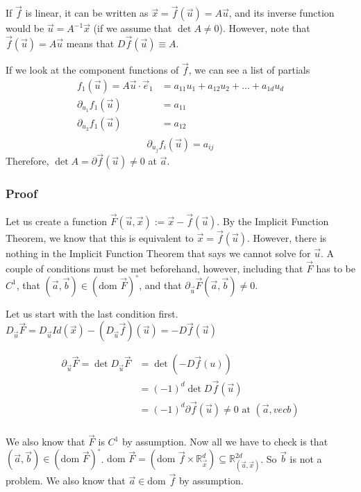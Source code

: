 \documentclass[11 pt, twoside]{article}
\begin{document}
If $\vec{f}$ is linear, it can be written as $\vec{x} = \vec{f}(\vec{u}) =
A\vec{u}$, and its inverse function would be $\vec{u} = A^{-1}\vec{x}$ (if we
assume that $\det A \neq 0$). However, note that $\vec{f}(\vec{u}) = A\vec{u}$
means that $D\vec{f}(\vec{u}) \equiv A$.

If we look at the component functions of $\vec{f}$, we can see a list of
partials
\begin{align*}
f_1(\vec{u}) = A\vec{u} \cdot \vec{e}_1 &= a_{11}u_1 + a_{12}u_2 + \dots + a_{1d}u_d\\
\partial_{u_1}f_1(\vec{u}) &= a_{11}\\
\partial_{u_2}f_1(\vec{u}) &= a_{12}\\
\end{align*}
\[
\boxed{\partial_{u_j} f_i (\vec{u}) = a_{ij}}
\]
Therefore, $\det A = \partial \vec{f}(\vec{u}) \neq 0$ at $\vec{a}$.

\subsubsection{Proof}

Let us create a function $\vec{F} (\vec{u}, \vec{x}) := \vec{x} -
\vec{f}(\vec{u})$. By the Implicit Function Theorem, we know that this is
equivalent to $\vec{x} = \vec{f}(\vec{u})$. However, there is nothing in the
Implicit Function Theorem that says we cannot solve for $\vec{u}$. A couple of
conditions must be met beforehand, however, including that $\vec{F}$ has to be
$C^1$, that $(\vec{a}, \vec{b}) \in (\text{dom } \vec{F})^\circ$, and that
$\partial_{\vec{u}} \vec{F}(\vec{a}, \vec{b}) \neq 0$.

Let us start with the last condition first. $D_{\vec{u}} \vec{F} = D_{\vec{u}}
Id(\vec{x}) - (D_{\vec{u}}\vec{f})(\vec{u}) = -D\vec{f}(\vec{u})$

\begin{align*}
\partial_{\vec{u}}\vec{F} = \det D_{\vec{u}}\vec{F} &= \det (-D\vec{f}(u))\\
&= (-1)^d \det
D\vec{f}(\vec{u})\\
&= (-1)^d \partial \vec{f}(\vec{u}) \neq 0 \text{ at } (\vec{a}, vec{b})\\
\end{align*}

We also know that $\vec{F}$ is $C^1$ by assumption. Now all we have to check is
that $(\vec{a}, \vec{b}) \in (\text{dom } \vec{F})^\circ$. $\text{dom } \vec{F} = (\text{dom }
\vec{f} \times \mathbb{R}^d_{\vec{x}}) \subseteq
\mathbb{R}^{2d}_{(\vec{u}, \vec{x})}$. So $\vec{b}$ is not a problem. We also
know that $\vec{a} \in \text{dom } \vec{f}$ by assumption.
\end{document}
